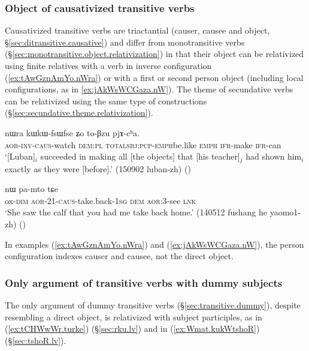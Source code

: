 \subsubsection{Object of causativized transitive verbs} \label{sec:object.causative.relativization}
Causativized transitive verbs are triactantial (causer, causee and object, §\ref{sec:ditransitive.causative}) and differ from monotransitive verbs (§\ref{sec:monotransitive.object.relativization}) in that their object can be relativized using finite relatives with a verb in inverse configuration (\ref{ex:tAwGznAmYo.nWra}) or with a first or second person object (including local configurations, as in \ref{ex:jAkWsWCGaza.nW}). The theme of secundative verbs can be relativized using the same type of constructions (§\ref{sec:secundative.theme.relativization}).

\begin{exe}
\ex \label{ex:tAwGznAmYo.nWra}
\gll [tɤ́-wɣ-z-nɤmɲo] nɯra kɯ\redp{}kɯ-fsɯ\redp{}fse ʑo to-βzu pjɤ-cʰa.   \\
\textsc{aor}-\textsc{inv}-\textsc{caus}-watch \textsc{dem}:\textsc{pl} \textsc{total}\redp{}\textsc{sbj}:\textsc{pcp}-\textsc{emph}\redp{}be.like \textsc{emph} \textsc{ifr}-make \textsc{ifr}-can \\
\glt `[Luban]$_i$ succeeded in making all [the objects] that [his teacher]$_j$ had shown him$_i$ exactly as they were [before].' (150902 luban-zh)
()
\end{exe} 
 
\begin{exe}
\ex \label{ex:jAkWsWCGaza.nW}
 nɯ pa-mto tɕe \\
ox-\textsc{dim} \textsc{aor}-2\fl{}1-\textsc{caus}-take.back-\textsc{1sg} \textsc{dem} \textsc{aor}:3\flobv{}-see \textsc{lnk} \\
\glt `She saw the calf that you had me take back home.' (140512 fushang he yaomo1-zh)
()
\end{exe} 

In examples (\ref{ex:tAwGznAmYo.nWra}) and (\ref{ex:jAkWsWCGaza.nW}), the person configuration indexes causer and causee, not the direct object. 

\subsubsection{Only argument of transitive verbs with dummy subjects}  \label{sec:dummy.subj.object.relativization}
The only argument of dummy transitive verbs (§\ref{sec:transitive.dummy}), despite resembling a direct object, is relativized with subject participles, as  in (\ref{ex:tCHWwWr.turke}) (§\ref{sec:rku.lv}) and  in (\ref{ex:Wmat.kukWtshoR}) (§\ref{sec:tshoR.lv}). 

